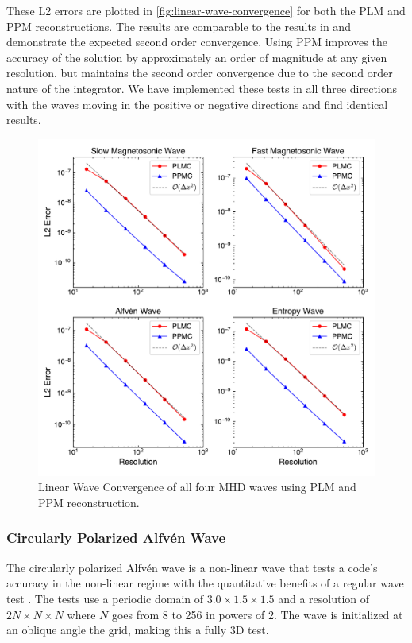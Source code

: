 \documentclass[modern]{aastex631}
\newcommand*{\img}[1]{%
    \raisebox{-.05\baselineskip}{%
        \texttt{[image: \#1]}%
    }%
}
\begin{document}
These L2 errors are plotted in \autoref{fig:linear-wave-convergence} for both the PLM and PPM reconstructions. The results are comparable to the results in \cite{stone_2009} and demonstrate the expected second order convergence. Using PPM improves the accuracy of the solution by approximately an order of magnitude at any given resolution, but maintains the second order convergence due to the second order nature of the integrator. We have implemented these tests in all three directions with the waves moving in the positive or negative directions and find identical results.

\begin{figure}[ht!]
    \includegraphics[width=\linewidth]{linear_convergence.pdf}
    \caption{Linear Wave Convergence of all four MHD waves using PLM and PPM reconstruction. \href{https://zenodo.org/records/10927223}{\img{zenodo-gradient-200.png}}}
    \label{fig:linear-wave-convergence}
\end{figure}

\subsubsection{Circularly Polarized Alfv\'en Wave}
\label{sec:cpaw}

The circularly polarized Alfv\'en wave is a non-linear wave that tests a code's accuracy in the non-linear regime with the quantitative benefits of a regular wave test \citep{Toth1996}. The tests use a periodic domain of $3.0\times1.5\times1.5$ and a resolution of $2N\times N \times N$ where $N$ goes from 8 to 256 in powers of 2. The wave is initialized at an oblique angle the grid, making this a fully 3D test.
\end{document}
